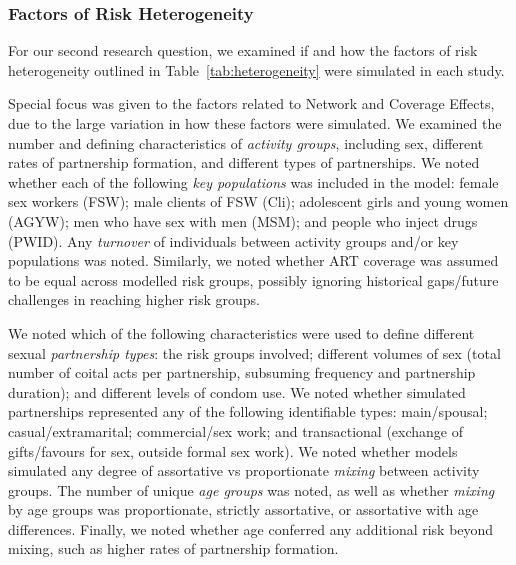 \subsubsection{Factors of Risk Heterogeneity}
\label{sss:meth:factors}
For our second research question, we examined if and how
the factors of risk heterogeneity outlined in Table~\ref{tab:heterogeneity}
were simulated in each study.
\par
Special focus was given to the factors related to Network and Coverage Effects,
due to the large variation in how these factors were simulated.
We examined the number and defining characteristics of
\emph{activity groups}, including
sex, different rates of partnership formation, and different types of partnerships.
We noted whether each of the following \emph{key populations} was included in the model:
female sex workers (FSW);
male clients of FSW (Cli);
adolescent girls and young women (AGYW);
men who have sex with men (MSM);
and people who inject drugs (PWID).
Any \emph{turnover} of individuals between
activity groups and/or key populations was noted.
Similarly, we noted whether ART coverage was assumed to be
equal across modelled risk groups,
possibly ignoring historical gaps/future challenges in reaching higher risk groups.
\par
We noted which of the following characteristics were used to define
different sexual \emph{partnership types}:
the risk groups involved;
different volumes of sex
(total number of coital acts per partnership,
subsuming frequency and partnership duration);
and different levels of condom use.
We noted whether simulated partnerships represented
any of the following identifiable types:
main/spousal;
casual/extramarital;
commercial/sex work;
and transactional (exchange of gifts/favours for sex, outside formal sex work).
We noted whether models simulated any degree of assortative vs proportionate
\emph{mixing} between activity groups.
The number of unique \emph{age groups} was noted, as well as
whether \emph{mixing} by age groups was
proportionate, strictly assortative, or assortative with age differences.
Finally, we noted whether age conferred any additional risk beyond mixing,
such as higher rates of partnership formation.
